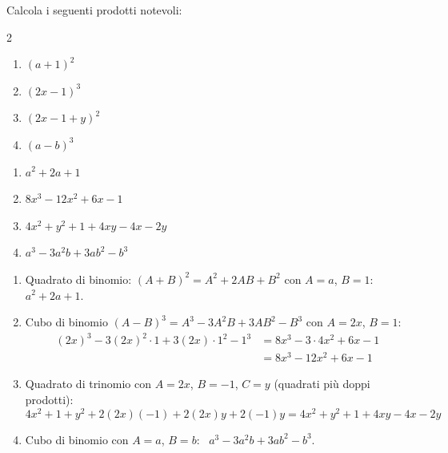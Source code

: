 \begin{question}[ID=2.2, subtitle={Prodotti notevoli — serie 2}, tags={prodotti notevoli, polinomi}, difficulty=facile]
Calcola i seguenti prodotti notevoli:
\begin{center}\begin{minipage}{0.92\linewidth}
\begin{multicols}{2}
\begin{enumerate}[leftmargin=3.2cm]
\item $(a+1)^2$
\item $(2x - 1)^3$
\item $(2x - 1 + y)^2$
\item $(a-b)^3$
\end{enumerate}
\end{multicols}
\end{minipage}\end{center}
\begin{solution}
\begin{enumerate}
    \item $a^2+2a+1$
    \item $8x^3-12x^2+6x-1$
    \item $4x^2+y^2+1+4xy-4x-2y$
    \item $a^3-3a^2b+3ab^2-b^3$
\end{enumerate}
\end{solution}
\begin{explanation}
\begin{enumerate}
    \item Quadrato di binomio: $(A+B)^2=A^2+2AB+B^2$ con $A=a$, $B=1$: \ $a^2+2a+1$.
    \item Cubo di binomio $(A-B)^3=A^3-3A^2B+3AB^2-B^3$ con $A=2x$, $B=1$:
    \[\begin{aligned}
    (2x)^3-3(2x)^2\cdot1+3(2x)\cdot1^2-1^3 &= 8x^3-3\cdot4x^2+6x-1\\
    &= 8x^3-12x^2+6x-1
    \end{aligned}\]
    \item Quadrato di trinomio con $A=2x$, $B=-1$, $C=y$ (quadrati più doppi prodotti):
    \[ 4x^2+1+y^2+2(2x)(-1)+2(2x)y+2(-1)y=4x^2+y^2+1+4xy-4x-2y \]
    \item Cubo di binomio con $A=a$, $B=b$: \ $a^3-3a^2b+3ab^2-b^3$.
\end{enumerate}
\end{explanation}
\end{question}

